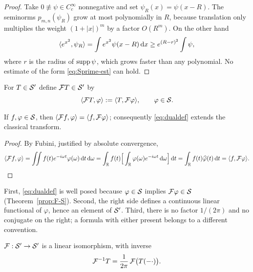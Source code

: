 \begin{proof}
Take $0\not\equiv\psi\in C_{c}^{\infty}$ nonnegative and set $\psi_{R}(x)=\psi(x-R)$. The seminorms
$p_{m,n}(\psi_{R})$ grow at most polynomially in $R$, because translation only multiplies the weight
$(1+|x|)^{m}$ by a factor $O(R^{m})$. On the other hand
\begin{equation}
\langle e^{x^{2}},\psi_{R}\rangle=\int e^{x^{2}}\psi(x-R)\,\mathrm{d} x\ge e^{(R-r)^{2}}\int\psi ,
\end{equation}
where $r$ is the radius of $\operatorname{supp}\psi$, which grows faster than any polynomial. No estimate of the
form \eqref{eq:Sprime-est} can hold.
\end{proof}

\begin{definition}\label{def:FTdist}
For $T\in\mathcal{S}'$ define $\mathcal{F} T\in\mathcal{S}'$ by
\begin{equation}
\langle \mathcal{F} T,\varphi\rangle:=\langle T,\mathcal{F}\varphi\rangle,
\qquad \varphi\in\mathcal{S} .
\label{eq:dualdef}
\end{equation}
\end{definition}

\begin{proposition}\label{prop:dual-consistency}
If $f,\varphi\in\mathcal{S}$, then $\langle \mathcal{F} f,\varphi\rangle=\langle f,\mathcal{F}\varphi\rangle$; consequently \eqref{eq:dualdef}
extends the classical transform.
\end{proposition}

\begin{proof}
By Fubini, justified by absolute convergence,
\begin{equation}
\langle \mathcal{F} f,\varphi\rangle
=\iint f(t)e^{-i\omega t}\varphi(\omega)\,\mathrm{d} t\,\mathrm{d}\omega
=\int_{\mathbb{R}}f(t)\Big[\int_{\mathbb{R}}\varphi(\omega)e^{-i\omega t}\,\mathrm{d}\omega\Big]\,\mathrm{d} t
=\int_{\mathbb{R}}f(t)\widehat{\varphi}(t)\,\mathrm{d} t=\langle f,\mathcal{F}\varphi\rangle . \qedhere
\end{equation}
\end{proof}

\begin{remark}
First, \eqref{eq:dualdef} is well posed because $\varphi\in\mathcal{S}$ implies
$\mathcal{F}\varphi\in\mathcal{S}$ (Theorem~\ref{prop:F-S}). Second, the right side defines a continuous linear
functional of $\varphi$, hence an element of $\mathcal{S}'$. Third, there is no factor $1/(2\pi)$ and no
conjugate on the right; a formula with either present belongs to a different convention.
\end{remark}

\begin{theorem}\label{thm:inverse}
$\mathcal{F}:\mathcal{S}'\to\mathcal{S}'$ is a linear isomorphism, with inverse
\begin{equation}
\mathcal{F}^{-1}T=\frac{1}{2\pi}\,\mathcal{F}\big(T(-\cdot)\big).
\end{equation}
\end{theorem}

